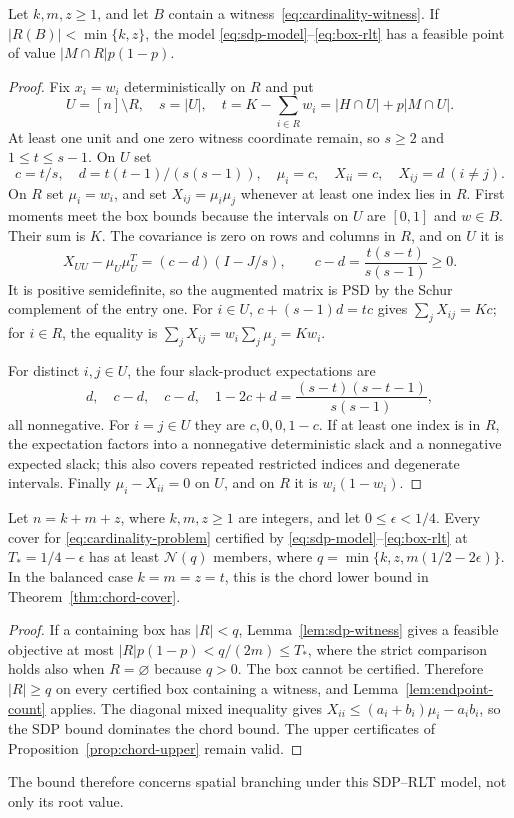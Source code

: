 \begin{lemma}\label{lem:sdp-witness}
Let $k,m,z\ge1$, and let $B$ contain a witness~\eqref{eq:cardinality-witness}.
If $|R(B)|<\min\{k,z\}$, the model
\eqref{eq:sdp-model}--\eqref{eq:box-rlt} has a feasible point of value
$|M\cap R|p(1-p)$.
\end{lemma}
\begin{proof}
Fix $x_i=w_i$ deterministically on $R$ and put
\[
 U=[n]\setminus R,\quad s=|U|,\quad
 t=K-\sum_{i\in R}w_i=|H\cap U|+p|M\cap U|.
\]
At least one unit and one zero witness coordinate remain, so $s\ge2$
and $1\le t\le s-1$. On $U$ set
\[
 c=t/s,\quad d=t(t-1)/(s(s-1)),\quad
 \mu_i=c,\quad X_{ii}=c,\quad X_{ij}=d\ (i\ne j).
\]
On $R$ set $\mu_i=w_i$, and set $X_{ij}=\mu_i\mu_j$ whenever at least
one index lies in $R$. First moments meet the box bounds because the
intervals on $U$ are $[0,1]$ and $w\in B$. Their sum is $K$.
The covariance is zero on rows and columns in $R$, and on $U$ it is
\[
 X_{UU}-\mu_U\mu_U^T
 =(c-d)(I-J/s),\qquad c-d=\frac{t(s-t)}{s(s-1)}\ge0.
\]
It is positive semidefinite, so the augmented matrix is PSD by the Schur
complement of the entry one. For $i\in U$,
$c+(s-1)d=tc$ gives $\sum_jX_{ij}=Kc$; for $i\in R$, the equality
is $\sum_jX_{ij}=w_i\sum_j\mu_j=Kw_i$.

For distinct $i,j\in U$, the four slack-product expectations are
\[
 d,\quad c-d,\quad c-d,\quad
 1-2c+d=\frac{(s-t)(s-t-1)}{s(s-1)},
\]
all nonnegative. For $i=j\in U$ they are $c,0,0,1-c$.
If at least one index is in $R$, the expectation factors into a
nonnegative deterministic slack and a nonnegative expected slack; this
also covers repeated restricted indices and degenerate intervals.
Finally $\mu_i-X_{ii}=0$ on $U$, and on $R$ it is $w_i(1-w_i)$.
\end{proof}

\begin{theorem}\label{thm:sdp-cover}
Let $n=k+m+z$, where $k,m,z\ge1$ are integers, and let
$0\le\epsilon<1/4$. Every cover for
\eqref{eq:cardinality-problem} certified by
\eqref{eq:sdp-model}--\eqref{eq:box-rlt} at $T_*=1/4-\epsilon$ has
at least $\mathcal N(q)$ members, where
$q=\min\{k,z,m(1/2-2\epsilon)\}$.
In the balanced case $k=m=z=t$, this is the chord lower bound in
Theorem~\ref{thm:chord-cover}.
\end{theorem}
\begin{proof}
If a containing box has $|R|<q$, Lemma~\ref{lem:sdp-witness} gives a
feasible objective at most $|R|p(1-p)<q/(2m)\le T_*$, where the
strict comparison holds also when $R=\varnothing$ because $q>0$.
The box cannot be certified. Therefore $|R|\ge q$ on every certified
box containing a witness, and Lemma~\ref{lem:endpoint-count} applies.
The diagonal mixed inequality gives
$X_{ii}\le(a_i+b_i)\mu_i-a_ib_i$, so the SDP bound dominates the
chord bound. The upper certificates of Proposition~\ref{prop:chord-upper}
remain valid.
\end{proof}
The bound therefore concerns spatial branching under this SDP--RLT
model, not only its root value.

